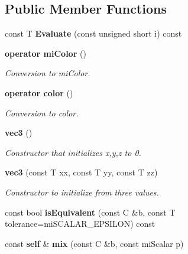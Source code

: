 \subsection*{Public Member Functions}
\begin{CompactItemize}
\item 
const T {\bf Evaluate} (const unsigned short i) const 
\item 
{\bf operator mi\-Color} ()
\begin{CompactList}\small\item\em Conversion to mi\-Color. \item\end{CompactList}\item 
{\bf operator color} ()
\begin{CompactList}\small\item\em Conversion to color. \item\end{CompactList}\item 
{\bf vec3} ()
\begin{CompactList}\small\item\em Constructor that initializes x,y,z to 0. \item\end{CompactList}\item 
{\bf vec3} (const T xx, const T yy, const T zz)
\begin{CompactList}\small\item\em Constructor to initialize from three values. \item\end{CompactList}\item 
const bool {\bf is\-Equivalent} (const C \&b, const T tolerance=mi\-SCALAR\_\-EPSILON) const 
\item 
const {\bf self} \& {\bf mix} (const C \&b, const mi\-Scalar p)
\end{CompactItemize}
